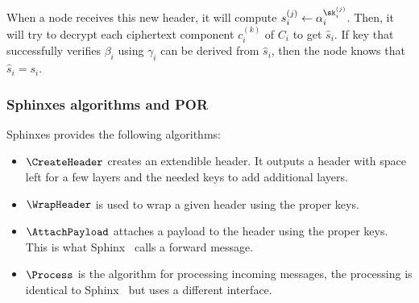 When a node receives this new header, it will compute \(s_i^{(j)}\gets 
  \alpha_i^{\sk_i^{(j)}}\).
Then, it will try to decrypt each ciphertext component \(c_i^{(k)}\) of \(C_i\) 
to get \(\hat s_i\).
If  key that successfully verifies \(\beta_i\) using \(\gamma_i\) can 
be derived from \(\hat s_i\), then the node knows that \(\hat s_i = s_i\).


\subsubsection{Sphinxes algorithms and \acf*{POR}}

\NewAlgorithm{\CreateHeader}{\Sphinxes[CreateHeader]}
\NewAlgorithm{\WrapHeader}{\Sphinxes[WrapHeader]}
\NewAlgorithm{\AttachPayload}{\Sphinxes[AttachPayload]}
\NewAlgorithm{\Process}{\Sphinxes[Process]}

Sphinxes provides the following algorithms:
\begin{itemize}
  \item \(\CreateHeader\) creates an extendible header.
    It outputs a header with space left for a few layers and the needed keys to 
    add additional layers.

  \item \(\WrapHeader\) is used to wrap a given header using the proper keys.

  \item \(\AttachPayload\) attaches a payload to the header using the proper 
    keys.
    This is what Sphinx~\cite[\S 3.3]{Sphinx} calls a forward message.

  \item \(\Process\) is the algorithm for processing incoming messages, the 
    processing is identical to Sphinx~\cite[\S 3.6, \S 3.7]{Sphinx} but uses a 
    different interface.
\end{itemize}

\NewVariable{\mac}{\mu}
\NewVariable{\prg}{\rho}
\NewVariable{\prp}{\pi}

